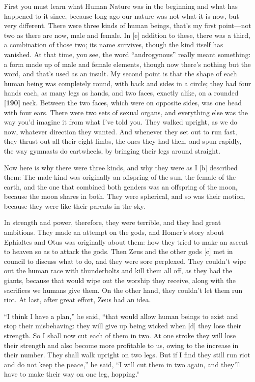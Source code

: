 First you must learn what Human Nature was in the beginning and what has
happened to it since, because long ago our nature was not what it is
now, but very different. There were three kinds of human beings, that's
my first point---not two as there are now, male and female. In {[}e{]}
addition to these, there was a third, a combination of those two; its
name survives, though the kind itself has vanished. At that time, you
see, the word “androgynous” really meant something: a form made up of
male and female elements, though now there's nothing but the word, and
that's used as an insult. My second point is that the shape of each
human being was completely round, with back and sides in a circle; they
had four hands each, as many legs as hands, and two faces, exactly
alike, on a rounded {\bf {[}190{]}} neck. Between the two faces, which
were on opposite sides, was one head with four ears. There were two sets
of sexual organs, and everything else was the way you'd imagine it from
what I've told you. They walked upright, as we do now, whatever
direction they wanted. And whenever they set out to run fast, they
thrust out all their eight limbs, the ones they had then, and spun
rapidly, the way gymnasts do cartwheels, by bringing their legs around
straight.

Now here is why there were three kinds, and why they were as I {[}b{]}
described them: The male kind was originally an offspring of the sun,
the female of the earth, and the one that combined both genders was an
offspring of the moon, because the moon shares in both. They were
spherical, and so was their motion, because they were like their parents
in the sky.

In strength and power, therefore, they were terrible, and they had great
ambitions. They made an attempt on the gods, and Homer's story about
Ephialtes and Otus was originally about them: how they tried to make an
ascent to heaven so as to attack the
gods. Then Zeus and
the other gods {[}c{]} met in council to discuss what to do, and they
were sore perplexed. They couldn't wipe out the human race with
thunderbolts and kill them all off, as they had the giants, because that
would wipe out the worship they receive, along with the sacrifices we
humans give them. On the other hand, they couldn't let them run riot. At
last, after great effort, Zeus had an idea.

“I think I have a plan,” he said, “that would allow human beings to
exist and stop their misbehaving: they will give up being wicked when
{[}d{]} they lose their strength. So I shall now cut each of them in
two. At one stroke they will lose their strength and also become more
profitable to us, owing to the increase in their number. They shall walk
upright on two legs. But if I find they still run riot and do not keep
the peace,” he said, “I will cut them in two again, and they'll have to
make their way on one leg, hopping.”

